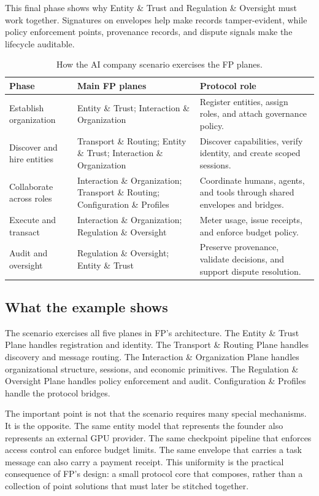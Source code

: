 This final phase shows why Entity \& Trust and Regulation \& Oversight must work together. Signatures on envelopes help make records tamper-evident, while policy enforcement points, provenance records, and dispute signals make the lifecycle auditable.

\begin{table}[!ht]
\centering
\caption{How the AI company scenario exercises the FP planes.}
\label{tab:scenario-planes}
\footnotesize
\begin{tabular}{@{}p{} p{} p{}@{}}
\toprule
\textbf{Phase} & \textbf{Main FP planes} & \textbf{Protocol role} \\
\midrule
Establish organization & Entity \& Trust; Interaction \& Organization & Register entities, assign roles, and attach governance policy. \\
Discover and hire entities & Transport \& Routing; Entity \& Trust; Interaction \& Organization & Discover capabilities, verify identity, and create scoped sessions. \\
Collaborate across roles & Interaction \& Organization; Transport \& Routing; Configuration \& Profiles & Coordinate humans, agents, and tools through shared envelopes and bridges. \\
Execute and transact & Interaction \& Organization; Regulation \& Oversight & Meter usage, issue receipts, and enforce budget policy. \\
Audit and oversight & Regulation \& Oversight; Entity \& Trust & Preserve provenance, validate decisions, and support dispute resolution. \\
\bottomrule
\end{tabular}
\end{table}

\subsection{What the example shows}
\label{subsec:scenario-takeaway}

The scenario exercises all five planes in FP's architecture. The Entity \& Trust Plane handles registration and identity. The Transport \& Routing Plane handles discovery and message routing. The Interaction \& Organization Plane handles organizational structure, sessions, and economic primitives. The Regulation \& Oversight Plane handles policy enforcement and audit. Configuration \& Profiles handle the protocol bridges.

The important point is not that the scenario requires many special mechanisms. It is the opposite. The same entity model that represents the founder also represents an external GPU provider. The same checkpoint pipeline that enforces access control can enforce budget limits. The same envelope that carries a task message can also carry a payment receipt. This uniformity is the practical consequence of FP's design: a small protocol core that composes, rather than a collection of point solutions that must later be stitched together.